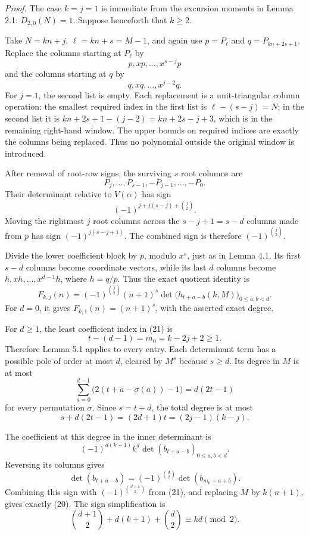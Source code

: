 \documentclass[
  11pt,
]{article}
\begin{document}
\emph{Proof.} The case \(k=j=1\) is immediate from the excursion moments
in Lemma 2.1: \(D_{2,0}(N)=1\). Suppose henceforth that \(k\ge2\).

Take \(N=kn+j\), \(\ell=kn+s=M-1\), and again use \(p=P_\ell\) and
\(q=P_{kn+2s+1}\). Replace the columns starting at \(P_\ell\) by \[
 p,xp,\ldots,x^{s-j}p
\] and the columns starting at \(q\) by \[
 q,xq,\ldots,x^{j-2}q.
\] For \(j=1\), the second list is empty. Each replacement is a
unit-triangular column operation: the smallest required index in the
first list is \(\ell-(s-j)=N\); in the second list it is
\(kn+2s+1-(j-2)=kn+2s-j+3\), which is in the remaining right-hand
window. The upper bounds on required indices are exactly the columns
being replaced. Thus no polynomial outside the original window is
introduced.

After removal of root-row signs, the surviving \(s\) root columns are \[
 P_j,\ldots,P_{s-1},-P_{j-1},\ldots,-P_0.
\] Their determinant relative to \(V(\alpha)\) has sign \[
 (-1)^{j+j(s-j)+\binom j2}.
\] Moving the rightmost \(j\) root columns across the \(s-j+1=s-d\)
columns made from \(p\) has sign \((-1)^{j(s-j+1)}\). The combined sign
is therefore \((-1)^{\binom j2}\).

Divide the lower coefficient block by \(p\), modulo \(x^s\), just as in
Lemma 4.1. Its first \(s-d\) columns become coordinate vectors, while
its last \(d\) columns become \(h,xh,\ldots,x^{d-1}h\), where \(h=q/p\).
Thus the exact quotient identity is \[
 F_{k,j}(n)=(-1)^{\binom j2}(n+1)^s
 \det\bigl(h_{t+a-b}(k,M)\bigr)_{0\le a,b<d}.
 \tag{21}
\] For \(d=0\), it gives \(F_{k,1}(n)=(n+1)^s\), with the asserted exact
degree.

For \(d\ge1\), the least coefficient index in (21) is \[
 t-(d-1)=m_0=k-2j+2\ge1.
\] Therefore Lemma 5.1 applies to every entry. Each determinant term has
a possible pole of order at most \(d\), cleared by \(M^s\) because
\(s\ge d\). Its degree in \(M\) is at most \[
 \sum_{a=0}^{d-1}\bigl(2(t+a-\sigma(a))-1\bigr)=d(2t-1)
\] for every permutation \(\sigma\). Since \(s=t+d\), the total degree
is at most \[
 s+d(2t-1)=(2d+1)t=(2j-1)(k-j).
\]

The coefficient at this degree in the inner determinant is \[
 (-1)^{d(k+1)}k^d\det(b_{t+a-b})_{0\le a,b<d}.
\] Reversing its columns gives \[
 \det(b_{t+a-b})=(-1)^{\binom d2}
                  \det(b_{m_0+a+b}).
\] Combining this sign with \((-1)^{\binom{d+1}{2}}\) from (21), and
replacing \(M\) by \(k(n+1)\), gives exactly (20). The sign
simplification is \[
 \binom{d+1}{2}+d(k+1)+\binom d2\equiv kd\pmod2.
\]
\end{document}
